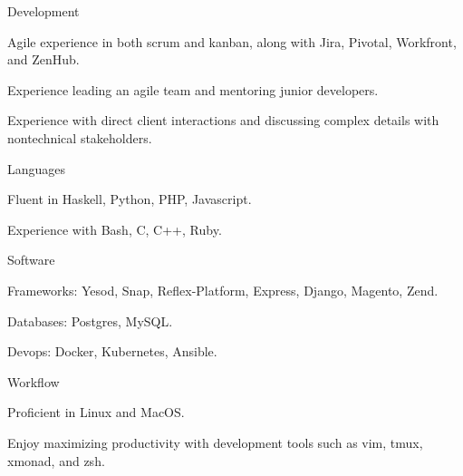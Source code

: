 \begin{cvskills}
  \cvskill
    {Development}
    {\begin{cvitems}
        \item Agile experience in both scrum and kanban, along with Jira, Pivotal, Workfront, and ZenHub.
        \item Experience leading an agile team and mentoring junior developers.
        \item Experience with direct client interactions and
          discussing complex details with nontechnical stakeholders.
     \end{cvitems}}
  \cvskill
    {Languages}
    {\begin{cvitems}
        \item Fluent in Haskell, Python, PHP, Javascript.
        \item Experience with Bash, C, C++, Ruby.
     \end{cvitems}}
  \cvskill
    {Software}
    {\begin{cvitems}
        \item Frameworks: Yesod, Snap, Reflex-Platform, Express, Django, Magento, Zend.
        \item Databases: Postgres, MySQL.
        \item Devops: Docker, Kubernetes, Ansible.
     \end{cvitems}}
  \cvskill
    {Workflow}
    {\begin{cvitems}
        \item Proficient in Linux and MacOS.
        \item Enjoy maximizing productivity with development tools such as
          vim, tmux, xmonad, and zsh.
     \end{cvitems}}
\end{cvskills}
